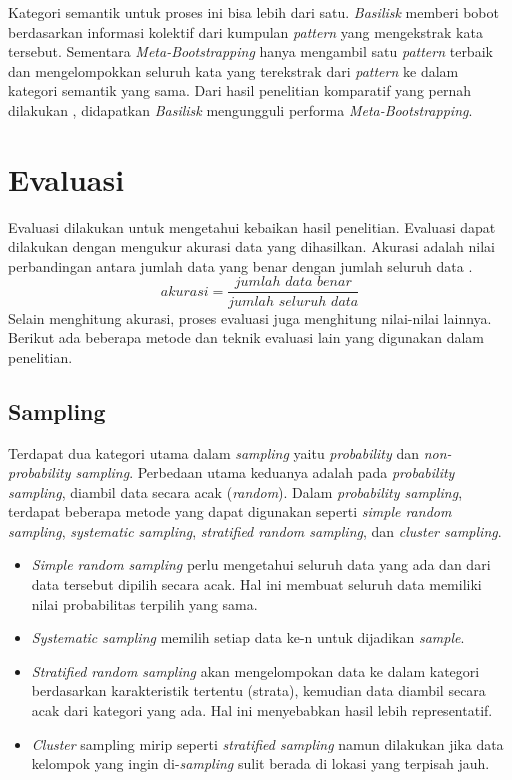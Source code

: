 Kategori semantik untuk proses ini bisa lebih dari satu. \textit{Basilisk} memberi bobot berdasarkan informasi kolektif dari kumpulan \textit{pattern} yang mengekstrak kata tersebut. Sementara \textit{Meta-Bootstrapping} hanya mengambil satu \textit{pattern} terbaik dan mengelompokkan seluruh kata yang terekstrak dari \textit{pattern} ke dalam kategori semantik yang sama. Dari hasil penelitian komparatif yang pernah dilakukan \citep{riloff2003learning}, didapatkan \textit{Basilisk} mengungguli performa \textit{Meta-Bootstrapping}. 


\section{Evaluasi}
Evaluasi dilakukan untuk mengetahui kebaikan hasil penelitian. Evaluasi dapat dilakukan dengan mengukur akurasi data yang dihasilkan. Akurasi adalah nilai perbandingan antara jumlah data yang benar dengan jumlah seluruh data \citep{manning2008introduction}. 
\begin{equation}
akurasi=\frac{jumlah\,\,data\,\,benar}{jumlah\,\,seluruh\,\,data}
\end{equation}
Selain menghitung akurasi, proses evaluasi juga menghitung nilai-nilai lainnya. Berikut ada beberapa metode dan teknik evaluasi lain yang digunakan dalam penelitian.

\subsection{Sampling}
Terdapat dua kategori utama dalam \textit{sampling} yaitu \textit{probability} dan \textit{non-probability sampling}. Perbedaan utama keduanya adalah pada \textit{probability sampling}, diambil data secara acak (\textit{random}). Dalam \textit{probability sampling}, terdapat beberapa metode yang dapat digunakan seperti \textit{simple random sampling}, \textit{systematic sampling}, \textit{stratified random sampling}, dan \textit{cluster sampling}.
\begin{itemize}
  \item \textit{Simple random sampling} perlu mengetahui seluruh data yang ada dan dari data tersebut dipilih secara acak. Hal ini membuat seluruh data memiliki nilai probabilitas terpilih yang sama. 
  \item \textit{Systematic sampling} memilih setiap data ke-n untuk dijadikan \textit{sample}. 
  \item \textit{Stratified random sampling} akan mengelompokan data ke dalam kategori berdasarkan karakteristik tertentu (strata), kemudian data diambil secara acak dari kategori yang ada. Hal ini menyebabkan hasil lebih representatif. 
  \item \textit{Cluster} sampling mirip seperti \textit{stratified sampling} namun dilakukan jika data kelompok yang ingin di-\textit{sampling} sulit berada di lokasi yang terpisah jauh.
\end{itemize}

